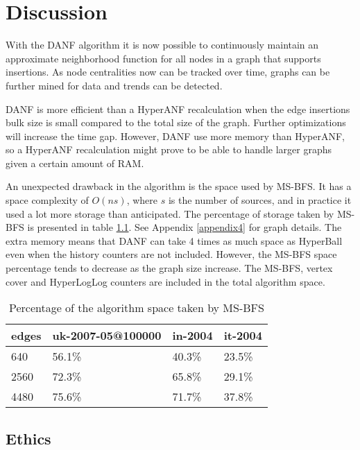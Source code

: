 \chapter{Discussion}
With the DANF algorithm it is now possible to continuously maintain an approximate neighborhood function for all nodes in a graph that supports insertions. As node centralities now can be tracked over time, graphs can be further mined for data and trends can be detected. 

DANF is more efficient than a HyperANF recalculation when the edge insertions bulk size is small compared to the total size of the graph. Further optimizations will increase the time gap. However, DANF use more memory than HyperANF, so a HyperANF recalculation might prove to be able to handle larger graphs given a certain amount of RAM. 

An unexpected drawback in the algorithm is the space used by MS-BFS. It has a space complexity of $O(ns)$, where $s$ is the number of sources, and in practice it used a lot more storage than anticipated. The percentage of storage taken by MS-BFS is presented in table \ref{table:ms-bfs_space}. See Appendix \ref{appendix4} for graph details. The extra memory means that DANF can take 4 times as much space as HyperBall even when the history counters are not included. However, the MS-BFS space percentage tends to decrease as the graph size increase. The MS-BFS, vertex cover and HyperLogLog counters are included in the total algorithm space.

\begin{table}[h]
    \center
    \begin{tabular}{ | l | l | l | l |}
        \hline
        edges & uk-2007-05@100000 & in-2004 & it-2004 \\ \hline
        640  & 56.1\% & 40.3\% & 23.5\% \\ \hline
        2560 & 72.3\% & 65.8\% & 29.1\% \\ \hline 
        4480 & 75.6\% & 71.7\% & 37.8\% \\
        \hline
    \end{tabular}
    \captionsetup{justification=centering}
    \caption{Percentage of the algorithm space taken by MS-BFS}
    \label{table:ms-bfs_space}
\end{table}

\section{Ethics}

